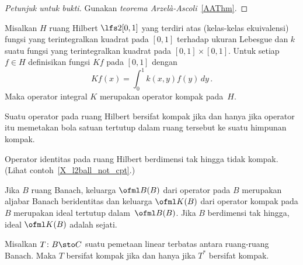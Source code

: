 \begin{proof}[\emph{Petunjuk untuk bukti}] Gunakan \emph{teorema Arzel\`a-Ascoli}~\ref{AAThm}.  \ns
\end{proof}

\begin{exam}\label{X_square_int_kernel} Misalkan $H$ ruang Hilbert $\lfs2{[0,1]}$ yang terdiri atas (kelas-kelas ekuivalensi) fungsi yang
terintegralkan kuadrat pada $[0,1]$ terhadap ukuran Lebesgue dan
$k$ suatu fungsi yang terintegralkan kuadrat
pada $[0,1] \times [0,1]$.  Untuk setiap $f \in H$ definisikan fungsi $Kf$ pada $[0,1]$ dengan
   \[ Kf(x) = \int_0^1 k(x,y)f(y)\,dy\,. \]
Maka operator integral $K$ merupakan operator kompak pada~$H$.
\end{exam}

\begin{prop} Suatu operator pada ruang Hilbert bersifat kompak jika dan hanya jika operator itu memetakan bola satuan tertutup dalam ruang tersebut
ke suatu himpunan kompak.
\end{prop}

\begin{cor}\label{cor_id_op_not_cpt} Operator identitas pada ruang Hilbert berdimensi tak hingga tidak kompak.
(Lihat contoh~\ref{X_l2ball_not_cpt}.)
\end{cor}

\begin{exam} Jika $B$ ruang Banach, keluarga $\ofml B(B)$ dari operator pada $B$ merupakan
aljabar Banach beridentitas dan
keluarga $\ofml K(B)$ dari operator kompak pada $B$ merupakan ideal tertutup dalam~$\ofml B(B)$.
Jika $B$ berdimensi tak hingga, ideal $\ofml K(B)$ adalah sejati.
\end{exam}

\begin{prop} Misalkan $T\colon B \sto C$ suatu pemetaan linear terbatas antara ruang-ruang Banach. Maka $T$ bersifat kompak
jika dan hanya jika $T^*$ bersifat kompak.
\end{prop}
